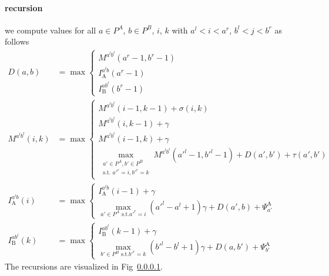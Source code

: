 \documentclass{article}
\newcommand{\DTmat}[2]{D(#1,#2)}
\newcommand{\MTmat}[4]{M^{{#1}^l {#2}^l}(#3,#4)}
\newcommand{\IATmat}[3]{I^{{#1}^l {#2}}_\textrm{A}(#3)}
\newcommand{\IBTmat}[3]{I^{{#1} {#2}^l}_\textrm{B}(#3)}
\newcommand{\PsiA}[1]{\Psi^\textrm{A}_{#1}}
\begin{document}
\paragraph{recursion}
we compute values for all $a\in P^A$, $b\in P^B$, $i$, $k$
with $a^l<i<a^r$, $b^l<j<b^r$ as follows
\begin{align}
  \DTmat{a}{b} &= \max
  \begin{cases}
    \MTmat{a}{b}{a^r-1}{b^r-1}\\
    \IATmat{a}{b}{a^r-1}\\
    \IBTmat{a}{b}{b^r-1}
  \end{cases}\label{recursionD}\\
  \MTmat{a}{b}{i}{k} &= \max
  \begin{cases}
    \MTmat{a}{b}{i-1}{k-1} + \sigma(i,k)\\
    \MTmat{a}{b}{i}{k-1} + \gamma\\
    \MTmat{a}{b}{i-1}{k} + \gamma\\
    \max_{\substack{a'\in P^A,b'\in P^B\\\text{s.t. } a'^r=i, b'^r=k}}\limits \MTmat{a}{b}{a'^l-1}{b'^l-1} + \DTmat{a'}{b'} + \tau(a',b')
  \end{cases}\label{recursionM}\\
  \IATmat{a}{b}{i} &= \max
  \begin{cases}
    \IATmat{a}{b}{i-1} + \gamma\\
    \max_{a'\in P^A\text{ s.t.} a'^r=i}\limits (a'^l-a^l+1)\gamma + \DTmat{a'}{b} +  \PsiA{a'}
  \end{cases}\label{recursionIA}\\
  \IBTmat{a}{b}{k} &= \max
  \begin{cases}
    \IBTmat{a}{b}{k-1} + \gamma\\
    \max_{b'\in P^B\text{ s.t.} b'^r=k}\limits (b'^l-b^l+1)\gamma +
    \DTmat{a}{b'} + \PsiA{b'}
  \end{cases}\label{recursionIB}
\end{align}
The recursions are visualized in Fig~\ref{}.
\end{document}
